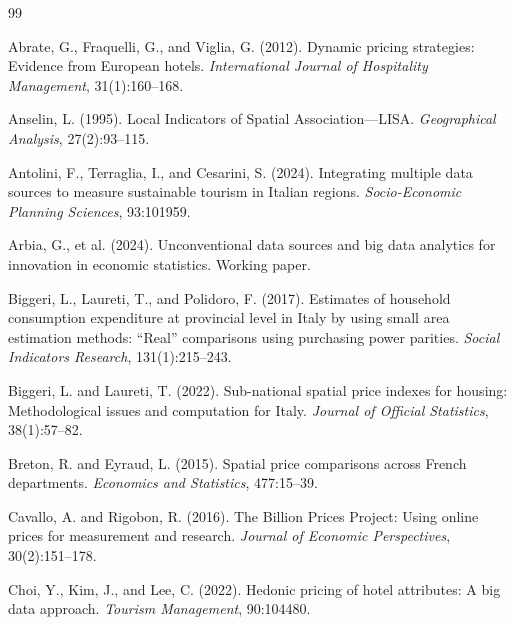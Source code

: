 \documentclass[12pt,a4paper]{article}
\begin{document}
\newpage
\begin{thebibliography}{99}

Abrate, G., Fraquelli, G., and Viglia, G. (2012).
Dynamic pricing strategies: Evidence from European hotels.
\textit{International Journal of Hospitality Management}, 31(1):160--168.

Anselin, L. (1995).
Local Indicators of Spatial Association---LISA.
\textit{Geographical Analysis}, 27(2):93--115.

Antolini, F., Terraglia, I., and Cesarini, S. (2024).
Integrating multiple data sources to measure sustainable tourism in Italian regions.
\textit{Socio-Economic Planning Sciences}, 93:101959.

Arbia, G., et al. (2024).
Unconventional data sources and big data analytics for innovation in economic statistics.
Working paper.

Biggeri, L., Laureti, T., and Polidoro, F. (2017).
Estimates of household consumption expenditure at provincial level in Italy by using small area estimation methods: ``Real'' comparisons using purchasing power parities.
\textit{Social Indicators Research}, 131(1):215--243.

Biggeri, L. and Laureti, T. (2022).
Sub-national spatial price indexes for housing: Methodological issues and computation for Italy.
\textit{Journal of Official Statistics}, 38(1):57--82.

Breton, R. and Eyraud, L. (2015).
Spatial price comparisons across French departments.
\textit{Economics and Statistics}, 477:15--39.

Cavallo, A. and Rigobon, R. (2016).
The Billion Prices Project: Using online prices for measurement and research.
\textit{Journal of Economic Perspectives}, 30(2):151--178.

Choi, Y., Kim, J., and Lee, C. (2022).
Hedonic pricing of hotel attributes: A big data approach.
\textit{Tourism Management}, 90:104480.


\end{thebibliography}
\end{document}
